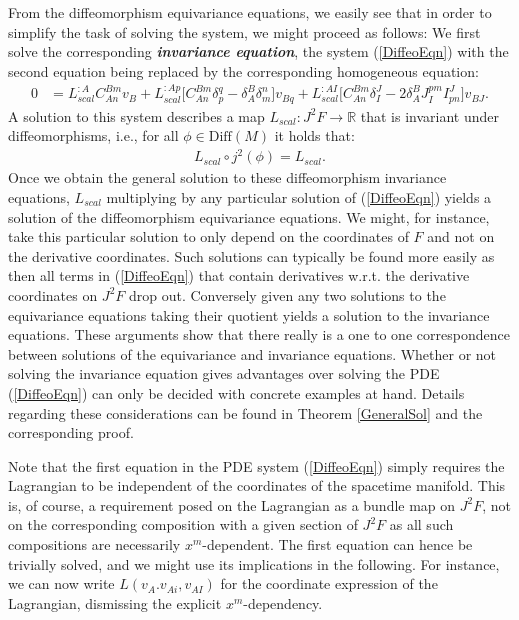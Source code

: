 From the diffeomorphism equivariance equations, we easily see that in order to simplify the task of solving the system, we might proceed as follows:
We first solve the corresponding \textit{\textbf{invariance equation}}, the system (\ref{DiffeoEqn}) with the second equation being replaced by the corresponding homogeneous equation:
\begin{align}
    0 &= L_{scal}^{:A} C_{An}^{Bm} v_B + L_{scal}^{:Ap} \bigl[ C_{An}^{Bm} \delta_p^q - \delta_A^B \delta_m^n \bigr] v_{Bq} + L_{scal}^{:AI} \bigl[ C_{An}^{Bm} \delta_I^J - 2 \delta_A^B J_I^{pm} I^J_{pn}  \bigr] v_{BJ}.
\end{align}
A solution to this system describes a map $L_{scal}: J^2F \rightarrow \mathbb{R}$ that is invariant under diffeomorphisms, i.e., for all $\phi \in \mathrm{Diff}(M)$ it holds that:
\begin{align}
    L_{scal} \circ j^2(\phi) = L_{scal}.
\end{align}
Once we obtain the general solution to these diffeomorphism invariance equations, $L_{scal}$ multiplying by any particular solution of (\ref{DiffeoEqn}) yields a solution of the diffeomorphism equivariance equations. We might, for instance, take this particular solution to only depend on the coordinates of $F$ and not on the derivative coordinates. Such solutions can typically be found more easily as then all terms in (\ref{DiffeoEqn}) that contain derivatives w.r.t. the derivative coordinates on $J^2F$ drop out. Conversely given any two solutions to the equivariance equations taking their quotient yields a solution to the invariance equations. These arguments show that there really is a one to one correspondence between solutions of the equivariance and invariance equations. Whether or not solving the invariance equation gives advantages over solving the PDE (\ref{DiffeoEqn}) can only be decided with concrete examples at hand. Details regarding these considerations can be found in Theorem \ref{GeneralSol} and the corresponding proof. 

Note that the first equation in the PDE system (\ref{DiffeoEqn}) simply requires the Lagrangian to be independent of the coordinates of the spacetime manifold. This is, of course, a requirement posed on the Lagrangian as a bundle map on $J^2F$, not on the corresponding composition with a given section of $J^2F$ as all such compositions are necessarily $x^m$-dependent. The first equation can hence be trivially solved, and we might use its implications in the following. For instance, we can now write $L(v_A.v_{Ai},v_{AI})$ for the coordinate expression of the Lagrangian, dismissing the explicit $x^m$-dependency.

